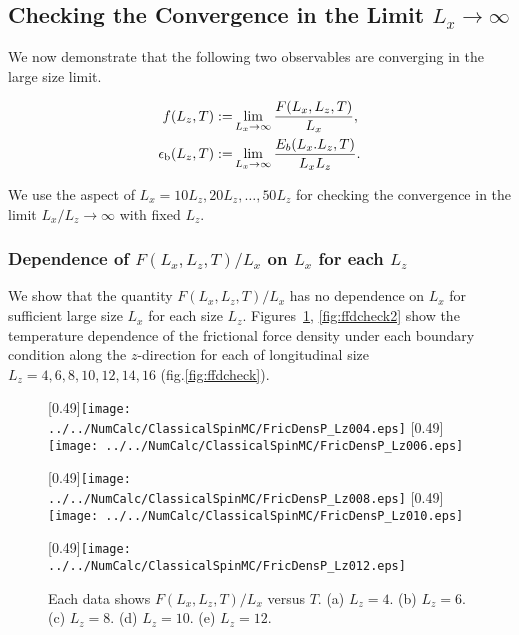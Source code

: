 \subsection{Checking the Convergence in the Limit $L_{x}\to\infty$}
\label{appsec:convcheck}

We now demonstrate that the following two observables are converging in the large size limit.

\begin{align}
f(L_{z}, T):=&\lim_{L_{x}\to\infty}\frac{F(L_{x}, L_{z}, T)}{L_{x}},\\
\epsilon_{\rm b}(L_{z}, T):=&\lim_{L_{x}\to\infty}\frac{E_{b}(L_{x}. L_{z}, T)}{L_{x}L_{z}}.
\end{align}

We use the aspect of $L_{x}=10L_{z}, 20L_{z}, \dots, 50L_{z}$ for checking the convergence in the limit $L_{x}/L_{z} \to \infty$ with fixed $L_{z}$.

\subsubsection{Dependence of $F(L_{x}, L_{z}, T)/L_{x}$ on $L_{x}$ for each $L_{z}$}

We show that the quantity $F(L_{x}, L_{z}, T)/L_{x}$ has no dependence on $L_{x}$ for sufficient large size $L_{x}$ for each size $L_{z}$. Figures~\ref{fig:ffdcheck1}, \ref{fig:ffdcheck2} show the temperature dependence of the frictional force density under each boundary condition along the $z$-direction for each of longitudinal size $L_{z} = 4, 6, 8, 10, 12, 14, 16$ (fig.\ref{fig:ffdcheck}).

\begin{figure}[htbp]
	\centering
	\subcaptionbox{\label{fig:ffdcheckfor004}}[0.49\linewidth]{\texttt{[image: ../../NumCalc/ClassicalSpinMC/FricDensP\_Lz004.eps]}}
	\subcaptionbox{\label{fig:ffdcheckfor006}}[0.49\linewidth]{\texttt{[image: ../../NumCalc/ClassicalSpinMC/FricDensP\_Lz006.eps]}}
	
	\subcaptionbox{\label{fig:ffdcheckfor008}}[0.49\linewidth]{\texttt{[image: ../../NumCalc/ClassicalSpinMC/FricDensP\_Lz008.eps]}}
	\subcaptionbox{\label{fig:ffdcheckfor010}}[0.49\linewidth]{\texttt{[image: ../../NumCalc/ClassicalSpinMC/FricDensP\_Lz010.eps]}}
	
	\subcaptionbox{\label{fig:ffdcheckfor012}}[0.49\linewidth]{\texttt{[image: ../../NumCalc/ClassicalSpinMC/FricDensP\_Lz012.eps]}}
	
	\caption{Each data shows $F(L_{x}, L_{z}, T)/L_{x}$ versus $T$. (a) $L_{z}=4$. (b) $L_{z}=6$. (c) $L_{z}=8$. (d) $L_{z}=10$. (e) $L_{z}=12$.}
	\label{fig:ffdcheck1}
\end{figure}

